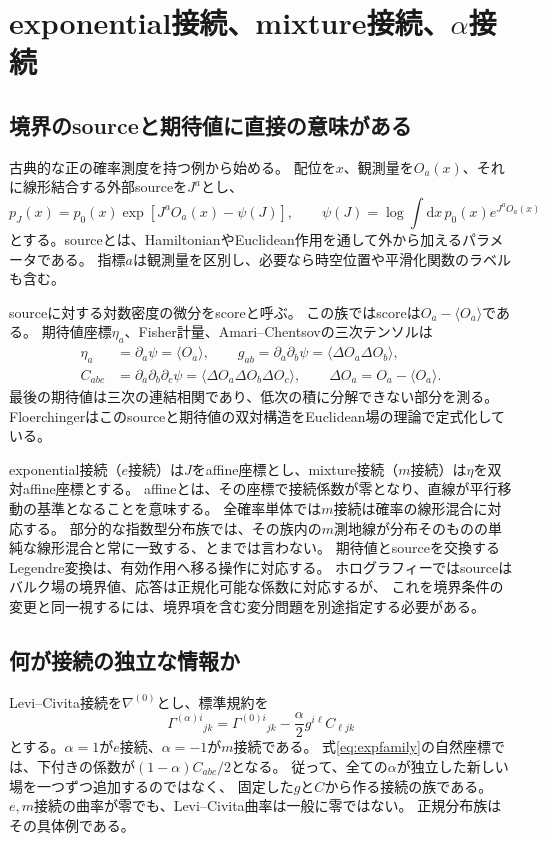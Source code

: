 \documentclass[a4paper,11pt]{ltjsarticle}
\numberwithin{equation}{section}
\newcommand{\dd}{\mathrm d}
\begin{document}
\section{exponential接続、mixture接続、$\alpha$接続}
\subsection{境界のsourceと期待値に直接の意味がある}
古典的な正の確率測度を持つ例から始める。
配位を$x$、観測量を$O_a(x)$、それに線形結合する外部sourceを$J^a$とし、
\begin{equation}
 p_J(x)=p_0(x)\exp[J^aO_a(x)-\psi(J)],\qquad
 \psi(J)=\log\int\dd x\,p_0(x)e^{J^aO_a(x)}
 \label{eq:expfamily}
\end{equation}
とする。sourceとは、HamiltonianやEuclidean作用を通して外から加えるパラメータである。
指標$a$は観測量を区別し、必要なら時空位置や平滑化関数のラベルも含む。

sourceに対する対数密度の微分をscoreと呼ぶ。
この族ではscoreは$O_a-\langle O_a\rangle$である。
期待値座標$\eta_a$、Fisher計量、Amari--Chentsovの三次テンソルは
\begin{align}
 \eta_a&=\partial_a\psi=\langle O_a\rangle,\qquad
 g_{ab}=\partial_a\partial_b\psi=\langle\Delta O_a\Delta O_b\rangle,
 \label{eq:response2}\\
 C_{abc}&=\partial_a\partial_b\partial_c\psi
 =\langle\Delta O_a\Delta O_b\Delta O_c\rangle,
 \qquad \Delta O_a=O_a-\langle O_a\rangle.
 \label{eq:response3}
\end{align}
最後の期待値は三次の連結相関であり、低次の積に分解できない部分を測る。
Floerchingerはこのsourceと期待値の双対構造をEuclidean場の理論で定式化している\cite{Floerchinger}。

exponential接続（$e$接続）は$J$をaffine座標とし、mixture接続（$m$接続）は$\eta$を双対affine座標とする。
affineとは、その座標で接続係数が零となり、直線が平行移動の基準となることを意味する。
全確率単体では$m$接続は確率の線形混合に対応する。
部分的な指数型分布族では、その族内の$m$測地線が分布そのものの単純な線形混合と常に一致する、とまでは言わない。
期待値とsourceを交換するLegendre変換は、有効作用へ移る操作に対応する。
ホログラフィーではsourceはバルク場の境界値、応答は正規化可能な係数に対応するが、
これを境界条件の変更と同一視するには、境界項を含む変分問題を別途指定する必要がある。

\subsection{何が接続の独立な情報か}
Levi--Civita接続を$\nabla^{(0)}$とし、標準規約を
\begin{equation}
 \Gamma^{(\alpha)i}{}_{jk}
 =\Gamma^{(0)i}{}_{jk}-\frac\alpha2 g^{i\ell}C_{\ell jk}
 \label{eq:alpha}
\end{equation}
とする。$\alpha=1$が$e$接続、$\alpha=-1$が$m$接続である。
式\eqref{eq:expfamily}の自然座標では、下付きの係数が$(1-\alpha)C_{abc}/2$となる。
従って、全ての$\alpha$が独立した新しい場を一つずつ追加するのではなく、
固定した$g$と$C$から作る接続の族である\cite{EGJ,Floerchinger}。
$e,m$接続の曲率が零でも、Levi--Civita曲率は一般に零ではない。
正規分布族はその具体例である。
\end{document}
